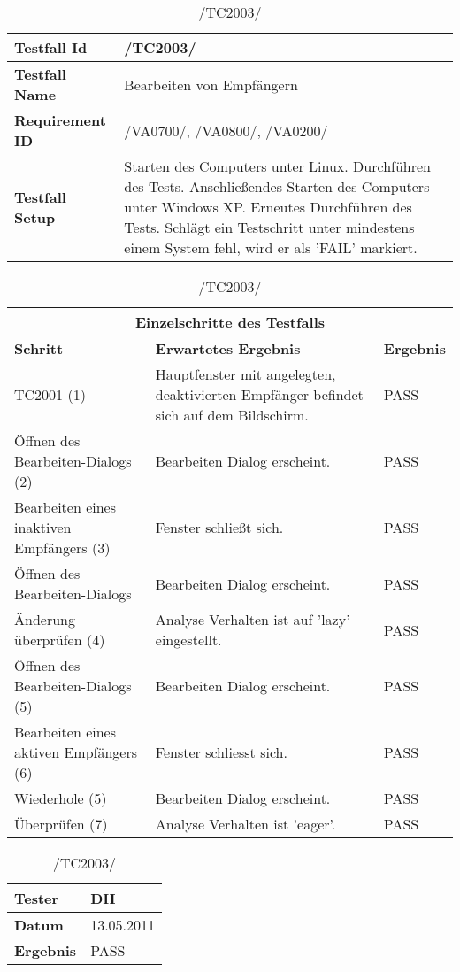 \begin{table}[h]
\caption{/TC2003/}
\label{tab:TC2003}
\begin{center}
\begin{tabular}{|p{3.5cm}|p{11cm}|}
\hline
\textbf{Testfall Id} & /TC2003/\\
\hline
\textbf{Testfall Name} & Bearbeiten von Empfängern\\
\hline
\textbf{Requirement ID} & /VA0700/, /VA0800/, /VA0200/\\
\hline
\textbf{Testfall Setup} & Starten des Computers unter Linux. Durchführen des Tests.
Anschließendes Starten des Computers unter Windows XP. Erneutes Durchführen des Tests. Schlägt ein Testschritt unter mindestens einem System fehl, wird er als 'FAIL' markiert.\\
\hline
\end{tabular}
\begin{tabular}{|p{4cm}|p{7.8cm}|p{2.3cm}|}
\multicolumn{3}{|c|}{\textbf{Einzelschritte des Testfalls}} \\
\hline
\textbf{Schritt} & \textbf{Erwartetes Ergebnis} & \textbf{Ergebnis}\\
\hline
TC2001 (1)& Hauptfenster mit angelegten,
deaktivierten Empfänger befindet sich auf dem Bildschirm. & PASS\\
\hline
Öffnen des Bearbeiten-Dialogs (2) & Bearbeiten Dialog erscheint. & PASS\\
\hline
Bearbeiten eines inaktiven Empfängers (3) & Fenster schließt sich. & PASS\\
\hline
Öffnen des Bearbeiten-Dialogs & Bearbeiten Dialog erscheint. & PASS\\
\hline
Änderung überprüfen (4) & Analyse Verhalten ist auf 'lazy' eingestellt. & PASS\\
\hline
Öffnen des Bearbeiten-Dialogs (5) & Bearbeiten Dialog erscheint. & PASS\\
\hline
Bearbeiten eines aktiven Empfängers (6) & Fenster schliesst sich. & PASS\\
\hline
Wiederhole (5) & Bearbeiten Dialog erscheint. & PASS\\
\hline
Überprüfen (7) & Analyse Verhalten ist 'eager'. & PASS\\
\hline
\end{tabular}
\begin{tabular}{|p{3.5cm}|p{11cm}|}
\textbf{Tester} & DH\\
\hline
\textbf{Datum} & 13.05.2011\\
\hline
\textbf{Ergebnis} & PASS\\
\hline
\end{tabular}
\end{center}
\end{table}

